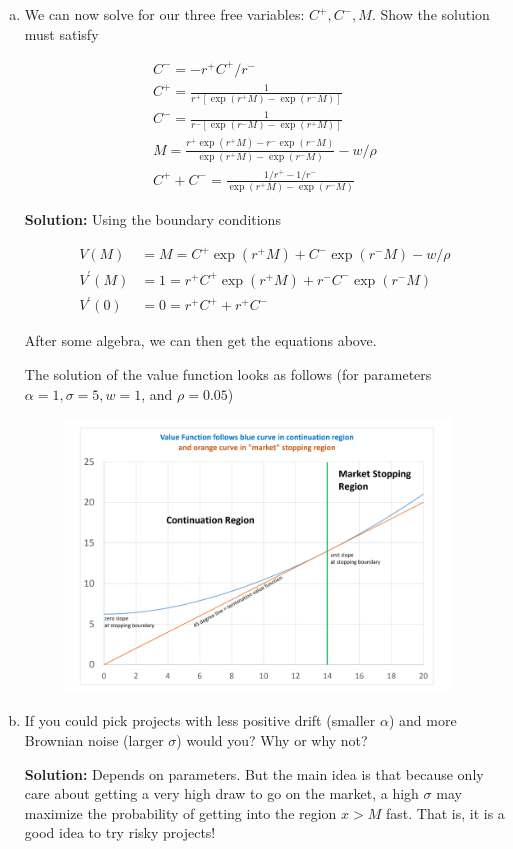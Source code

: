 \documentclass[11pt]{extarticle}
\theoremstyle{plain}
\theoremstyle{definition}
\begin{document}
\begin{enumerate}[(a)]
\item  We can now solve for our three free variables:  $C^{+}, C^{-}, M $. Show the solution must satisfy 

$$
\begin{gathered}
C^{-}=-r^{+} C^{+} / r^{-} \\
C^{+}=\frac{1}{r^{+}\left[\exp \left(r^{+} M\right)-\exp \left(r^{-} M\right)\right]} \\
C^{-}=\frac{1}{r^{-}\left[\exp \left(r^{-} M\right)-\exp \left(r^{+} M\right)\right]} \\
M=\frac{r^{+} \exp \left(r^{+} M\right)-r^{-} \exp \left(r^{-} M\right)}{\exp \left(r^{+} M\right)-\exp \left(r^{-} M\right)}-w / \rho \\
C^{+}+C^{-}=\frac{1 / r^{+}-1 / r^{-}}{\exp \left(r^{+} M\right)-\exp \left(r^{-} M\right)}
\end{gathered}
$$

\textbf{Solution:} Using the boundary conditions 

$$
\begin{aligned}
V(M) &=M=C^{+} \exp \left(r^{+} M\right)+C^{-} \exp \left(r^{-} M\right)-w / \rho \\
V^{\prime}(M) &=1=r^{+} C^{+} \exp \left(r^{+} M\right)+r^{-} C^{-} \exp \left(r^{-} M\right) \\
V^{\prime}(0) &=0=r^{+} C^{+}+r^{+} C^{-}
\end{aligned}
$$

After some algebra, we can then get the equations above.


The solution of the value function looks as follows (for parameters $\alpha=1, \sigma=5, w=1$, and $\rho=0.05$)

     \begin{figure}[H]
    \centering
    \includegraphics[width=10.2cm]{plot_value_market.png}
    \end{figure}

\item  If you could pick projects with less positive drift (smaller $\alpha$) and more
Brownian noise (larger $\sigma$) would you? Why or why not?

\textbf{Solution:} Depends on parameters. But the main idea is that because only care about getting a very high draw to go on the market, a high  $\sigma$ may maximize the probability of getting into the region $x>M$ fast.  That is, it is a good idea to try risky projects!

\end{enumerate}
\end{document}
